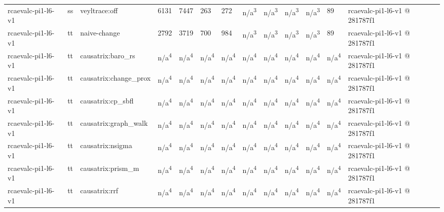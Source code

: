 \begin{table}[t]
\begin{tabular}{lllllllllllll}
rcaevalc-pi1-l6-v1 & ss & veyltrace:off & 6131 & 7447 & 263 & 272 & n/a\textsuperscript{3} & n/a\textsuperscript{3} & n/a\textsuperscript{3} & n/a\textsuperscript{3} & 89 & rcaevalc-pi1-l6-v1 @ 281787f1 \\
rcaevalc-pi1-l6-v1 & tt & naive-change & 2792 & 3719 & 700 & 984 & n/a\textsuperscript{3} & n/a\textsuperscript{3} & n/a\textsuperscript{3} & n/a\textsuperscript{3} & 89 & rcaevalc-pi1-l6-v1 @ 281787f1 \\
rcaevalc-pi1-l6-v1 & tt & causatrix:baro\_rs & n/a\textsuperscript{4} & n/a\textsuperscript{4} & n/a\textsuperscript{4} & n/a\textsuperscript{4} & n/a\textsuperscript{4} & n/a\textsuperscript{4} & n/a\textsuperscript{4} & n/a\textsuperscript{4} & n/a\textsuperscript{4} & rcaevalc-pi1-l6-v1 @ 281787f1 \\
rcaevalc-pi1-l6-v1 & tt & causatrix:change\_prox & n/a\textsuperscript{4} & n/a\textsuperscript{4} & n/a\textsuperscript{4} & n/a\textsuperscript{4} & n/a\textsuperscript{4} & n/a\textsuperscript{4} & n/a\textsuperscript{4} & n/a\textsuperscript{4} & n/a\textsuperscript{4} & rcaevalc-pi1-l6-v1 @ 281787f1 \\
rcaevalc-pi1-l6-v1 & tt & causatrix:cp\_sbfl & n/a\textsuperscript{4} & n/a\textsuperscript{4} & n/a\textsuperscript{4} & n/a\textsuperscript{4} & n/a\textsuperscript{4} & n/a\textsuperscript{4} & n/a\textsuperscript{4} & n/a\textsuperscript{4} & n/a\textsuperscript{4} & rcaevalc-pi1-l6-v1 @ 281787f1 \\
rcaevalc-pi1-l6-v1 & tt & causatrix:graph\_walk & n/a\textsuperscript{4} & n/a\textsuperscript{4} & n/a\textsuperscript{4} & n/a\textsuperscript{4} & n/a\textsuperscript{4} & n/a\textsuperscript{4} & n/a\textsuperscript{4} & n/a\textsuperscript{4} & n/a\textsuperscript{4} & rcaevalc-pi1-l6-v1 @ 281787f1 \\
rcaevalc-pi1-l6-v1 & tt & causatrix:nsigma & n/a\textsuperscript{4} & n/a\textsuperscript{4} & n/a\textsuperscript{4} & n/a\textsuperscript{4} & n/a\textsuperscript{4} & n/a\textsuperscript{4} & n/a\textsuperscript{4} & n/a\textsuperscript{4} & n/a\textsuperscript{4} & rcaevalc-pi1-l6-v1 @ 281787f1 \\
rcaevalc-pi1-l6-v1 & tt & causatrix:prism\_m & n/a\textsuperscript{4} & n/a\textsuperscript{4} & n/a\textsuperscript{4} & n/a\textsuperscript{4} & n/a\textsuperscript{4} & n/a\textsuperscript{4} & n/a\textsuperscript{4} & n/a\textsuperscript{4} & n/a\textsuperscript{4} & rcaevalc-pi1-l6-v1 @ 281787f1 \\
rcaevalc-pi1-l6-v1 & tt & causatrix:rrf & n/a\textsuperscript{4} & n/a\textsuperscript{4} & n/a\textsuperscript{4} & n/a\textsuperscript{4} & n/a\textsuperscript{4} & n/a\textsuperscript{4} & n/a\textsuperscript{4} & n/a\textsuperscript{4} & n/a\textsuperscript{4} & rcaevalc-pi1-l6-v1 @ 281787f1 \\

\end{tabular}
\end{table}

